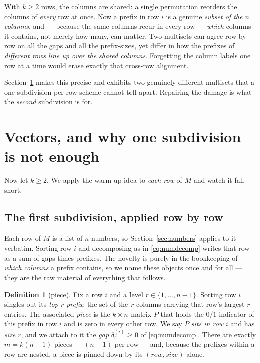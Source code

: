 \documentclass[11pt,a4paper]{article}
\theoremstyle{definition}
\newtheorem{definition}{Definition}[section]
\theoremstyle{plain}
\begin{document}
With $k\ge2$ rows, the columns are shared: a single permutation reorders the
columns of \emph{every} row at once. Now a prefix in row $i$ is a genuine
\emph{subset of the $n$ columns}, and --- because the same columns recur in
every row --- \emph{which} columns it contains, not merely how many, can matter.
Two multisets can agree row-by-row on all the gaps and all the prefix-sizes, yet
differ in how the prefixes of \emph{different rows line up over the shared
columns}. Forgetting the column labels one row at a time would erase exactly
that cross-row alignment.

Section~\ref{sec:rows} makes this precise and exhibits two genuinely different
multisets that a one-subdivision-per-row scheme cannot tell apart. Repairing
the damage is what the \emph{second} subdivision is for.

\section{Vectors, and why one subdivision is not enough}
\label{sec:rows}

Now let $k\ge2$. We apply the warm-up idea to \emph{each row} of $M$ and watch it
fall short.

\subsection{The first subdivision, applied row by row}

Each row of $M$ is a list of $n$ numbers, so Section~\ref{sec:numbers} applies to
it verbatim. Sorting row $i$ and decomposing as in \eqref{eq:numdecomp} writes
that row as a sum of gaps times prefixes. The novelty is purely in the
bookkeeping of \emph{which columns} a prefix contains, so we name these objects
once and for all --- they are the raw material of everything that follows.

\begin{definition}[piece]\label{def:piece}
Fix a row $i$ and a level $r\in\{1,\dots,n-1\}$. Sorting row $i$ singles out its
\emph{top-$r$ prefix}: the set of the $r$ columns carrying that row's largest $r$
entries. The associated \emph{piece} is the $k\times n$ matrix $P$ that holds the
$0/1$ indicator of this prefix in row $i$ and is zero in every other row. We say
$P$ \emph{sits in row $i$} and has \emph{size $r$}, and we attach to it the
\emph{gap} $\delta^{(i)}_r\ge0$ of \eqref{eq:numdecomp}. There are exactly
$m=k(n-1)$ pieces --- $(n-1)$ per row --- and, because the prefixes within a row
are nested, a piece is pinned down by its $(\textit{row},\textit{size})$ alone.
\end{definition}
\end{document}

